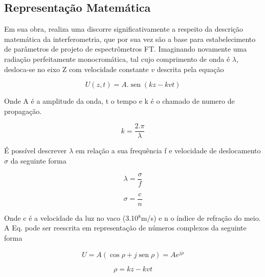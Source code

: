 \documentclass[oneside,openright,12pt]{ufsm_2021} %
\renewcommand{\sin}{\operatorname{sen}}
\begin{document}
    \subsection{Representação Matemática}

    \par Em sua obra, \cite{LivroFT} realiza uma discorre significativamente a respeito da descrição matemática da interferometria, que por sua vez são a base para estabelecimento de parâmetros de projeto de espectrômetros FT. Imaginando novamente uma radiação perfeitamente monocromática, tal cujo comprimento de onda é $\lambda$, desloca-se no eixo Z com velocidade constante $v$ descrita pela equação \cite{Eq9}

        \begin{equation}
            \label{eq:Dedu1}
             U(z,t) = A.\sin(kz-kvt)
        \end{equation}

    \par Onde A é a amplitude da onda, t o tempo e k é o chamado de numero de propagação.

        \begin{equation}
            \label{eq:Dedu2}
            k=\frac{2.\pi}{\lambda}
        \end{equation}

    \par É possível descrever $\lambda$ em relação a sua frequência f e velocidade de deslocamento $\sigma$ da seguinte forma

        \begin{equation}
            \label{eq:Dedu3}
            \lambda = \frac{\sigma}{f}
        \end{equation}

        \begin{equation}
            \label{eq:Dedu4}
            \sigma = \frac{c}{n}
        \end{equation}

    \par Onde c é a velocidade da luz no vaco (3.10$^8$m/s) e n o índice de refração do meio. A Eq. \cite{Eq9} pode ser reescrita em representação de números complexos da seguinte forma

        \begin{equation}
            U=A(\cos\rho+j\sin\rho) = Ae^{j\rho}
        \end{equation}
        
        \begin{equation}
            \rho = kz - kvt
        \end{equation}
\end{document}
